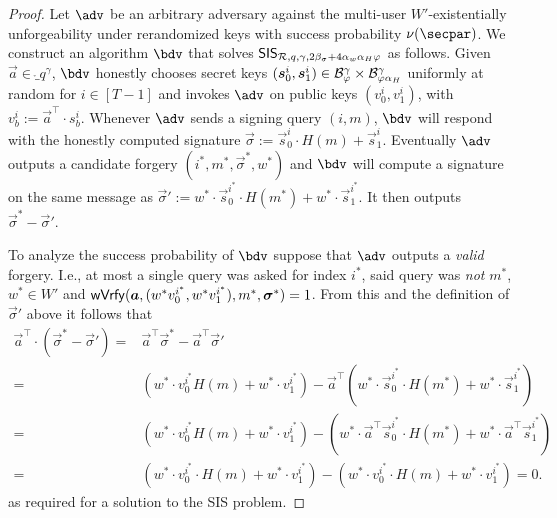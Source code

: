 \begin{proof}
  Let $\adv$ be an arbitrary adversary against the multi-user $W'$-existentially unforgeability under rerandomized keys with success probability $\nu(\secpar)$.
  We construct an algorithm $\sisadvkots$ that solves $\mathsf{SIS}_{\mathcal{R},q,\gamma,2\beta_\sigma + 4\alpha_w\alpha_H\varphi}$ as follows.
  Given $\vec{a}\in\ring_q^\gamma$, $\sisadvkots$ honestly chooses secret keys $(\boldsymbol{s}^i_0,\boldsymbol{s}^i_1) \in \mathcal{B}_{\varphi}^\gamma\times \mathcal{B}_{\varphi\alpha_H}^\gamma$ uniformly at random for $i\in[T-1]$ and invokes $\adv$ on public keys $(v^i_0,v^i_1)$, with $v^i_b := \vec{a}^\intercal\cdot s^i_b$.
  Whenever $\adv$ sends a signing query $(i,m)$, $\sisadvkots$ will respond with the honestly computed signature $\vec{\sigma}:=\vec{s}^i_0\cdot H(m)+ \vec{s}^i_1$.
  Eventually $\adv$ outputs a candidate forgery $(i^*,m^*,\vec{\sigma}^*,w^*)$ and $\sisadvkots$ will compute a signature on the same message as $\vec{\sigma}' := w^*\cdot\vec{s}^{i^*}_0\cdot H(m^*)+ w^*\cdot\vec{s}^{i^*}_1$.
  It then outputs $\vec{\sigma}^*-\vec{\sigma}'$.
  
  To analyze the success probability of $\sisadvkots$ suppose that $\adv$ outputs a \emph{valid} forgery.
  I.e., at most a single query was asked for index $i^*$, said query was \emph{not} $m^*$, $w^*\in W'$ and $\mathsf{wVrfy}(\boldsymbol{a},(w^*v^{i^*}_0,w^*v^{i^*}_1),m^*,\allowbreak\boldsymbol{\sigma}^*)=1$.
  From this and the definition of $\vec{\sigma}'$ above it follows that
  \begin{align*}
       \vec{a}^\intercal\cdot(\vec{\sigma}^*-\vec{\sigma}') ={}& \vec{a}^\intercal\vec{\sigma}^*-\vec{a}^\intercal\vec{\sigma}'\\ 
    ={}& (w^*\cdot v^{i^*}_0 H(m) + w^*\cdot v^{i^*}_1) - \vec{a}^\intercal(w^*\cdot \vec{s}^{i^*}_0\cdot H(m^*)+ w^*\cdot\vec{s}^{i^*}_1)\\
    ={}& (w^*\cdot v^{i^*}_0 H(m) + w^*\cdot v^{i^*}_1) - (w^*\cdot\vec{a}^\intercal\vec{s}^{i^*}_0\cdot H(m^*)+ w^*\cdot\vec{a}^\intercal\vec{s}^{i^*}_1)\\
    ={}& (w^*\cdot v^{i^*}_0\cdot H(m) + w^*\cdot v^{i^*}_1) - (w^*\cdot v^{i^*}_0\cdot H(m) + w^*\cdot v^{i^*}_1) = 0.
  \end{align*}
  as required for a solution to the SIS problem.
  

\end{proof}
